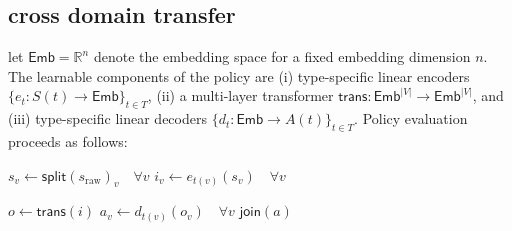 \documentclass[10pt]{article} %
\begin{document}
\begin{itemize}
\subsection{cross domain transfer}
\label{apdx:cross_domain}

let $\mathsf{Emb} = \mathbb{R}^n$ denote the embedding space for a fixed embedding dimension $n$. The learnable components of the policy are (i) type-specific linear encoders $\{e_t : S(t) \to \mathsf{Emb}\}_{t \in T}$, (ii) a multi-layer transformer $\mathsf{trans} : \mathsf{Emb}^{|V|} \to \mathsf{Emb}^{|V|}$, and (iii) type-specific linear decoders $\{d_t : \mathsf{Emb} \to A(t)\}_{t \in T}$. Policy evaluation proceeds as follows:

\begin{algorithmic}[1]
    \State $s_v \gets \mathsf{split}(s_\text{raw})_v \quad \forall v$
    \State $i_v \gets e_{t(v)}(s_v) \quad \forall v$
    
    \State $o \gets \mathsf{trans}(i)$
    \State $a_v \gets d_{t(v)}(o_v) \quad \forall v$
    \State \Return $\mathsf{join}(a)$
\EndFunction
\end{algorithmic}




\end{itemize}
\end{document}
